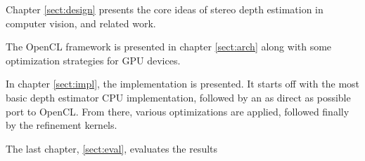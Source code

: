 Chapter \ref{sect:design} presents the core ideas of stereo depth
estimation in computer vision, and related work.

The OpenCL framework is presented in chapter \ref{sect:arch} along with
some optimization strategies for GPU devices.

In chapter \ref{sect:impl}, the implementation is presented. It starts
off with the most basic depth estimator CPU implementation, followed
by an as direct as possible port to OpenCL. From there, various
optimizations are applied, followed finally by the refinement kernels.

The last chapter, \ref{sect:eval}, evaluates the results
